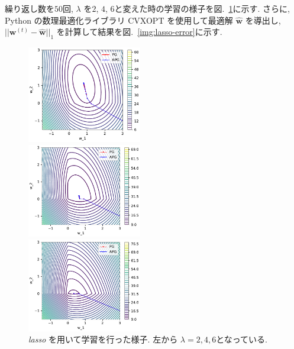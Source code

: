 \documentclass[a4paper,10pt]{jsarticle}
\begin{document}
繰り返し数を$50$回, $\lambda$ を$2$, $4$, $6$と変えた時の学習の様子を図.~\ref{img:lasso-result}に示す.
さらに, Python の数理最適化ライブラリ CVXOPT を使用して最適解 $\hat{\bm{w}}$ を導出し,
$||\bm{w}^{(t)} - \hat{\bm{w}}||_1$ を計算して結果を図.~\ref{img:lasso-error}に示す.

\begin{figure}[htbp]
 \begin{minipage}{0.33\hsize}
  \begin{center}
   \includegraphics[width=5cm]{figs/p2_lasso_result_lambda-2.pdf}
  \end{center}
 \end{minipage}
 \begin{minipage}{0.33\hsize}
  \begin{center}
   \includegraphics[width=5cm]{figs/p2_lasso_result_lambda-4.pdf}
  \end{center}
 \end{minipage}
 \begin{minipage}{0.33\hsize}
  \begin{center}
   \includegraphics[width=5cm]{figs/p2_lasso_result_lambda-6.pdf}
  \end{center}
 \end{minipage}
 \caption{\textit{lasso} を用いて学習を行った様子. 
 左から $\lambda=2, 4, 6$となっている.}
 \label{img:lasso-result}
\end{figure}
\end{document}
